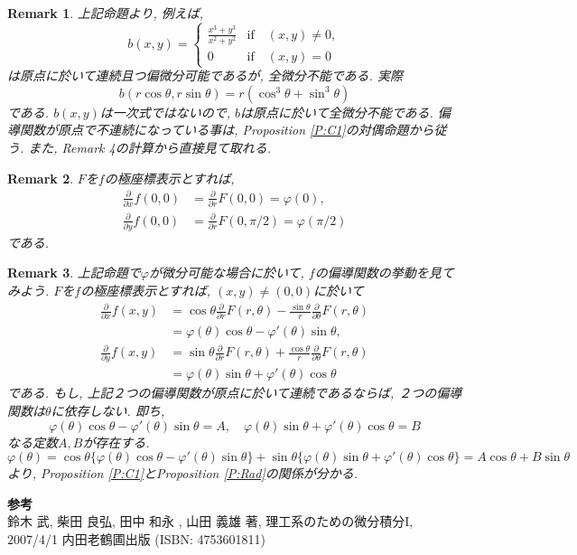 \documentclass{bxjsarticle}
\newtheorem{Remark}{Remark}%
\begin{document}
\begin{Remark}
上記命題より, 例えば,
	\[
	b(x,y) =
	\begin{cases}
	\frac{x^3+y^3}{x^2+y^2}
	&\mathrm{if} \quad (x,y) ≠ 0,\\
	0
	&\mathrm{if} \quad (x,y) = 0
	\end{cases}
	\]
は原点に於いて連続且つ偏微分可能であるが, 全微分不能である.
実際
	\[
	b(r \cos θ, r \sin θ)
	= r ( \cos^3 θ + \sin^3 θ)
	\]
である.
$b(x,y)$は一次式ではないので,
$b$は原点に於いて全微分不能である.
偏導関数が原点で不連続になっている事は,
Proposition \ref{P:C1}の対偶命題から従う.
また, Remark 4の計算から直接見て取れる.
\end{Remark}

\begin{Remark}
$F$を$f$の極座標表示とすれば,
	\begin{align*}
	\frac{∂}{∂x} f(0,0)
	&= \frac{∂}{∂ r} F(0,0) = φ(0),\\
	\frac{∂}{∂y} f(0,0)
	&= \frac{∂}{∂ r} F(0,π/2) = φ(π/2)
	\end{align*}
である.
\end{Remark}

\begin{Remark}
上記命題で$φ$が微分可能な場合に於いて,
$f$の偏導関数の挙動を見てみよう.
$F$を$f$の極座標表示とすれば,
$(x,y) ≠ (0,0)$に於いて
	\begin{align*}
	\frac{∂}{∂x} f(x,y)
	&= \cos θ \frac{∂}{∂ r} F(r,θ) - \frac{\sin θ}{r} \frac{∂}{∂ θ} F(r,θ)\\
	&= φ(θ) \cos θ - φ'(θ) \sin θ,\\
	\frac{∂}{∂y} f(x,y)
	&= \sin θ \frac{∂}{∂ r} F(r,θ) + \frac{\cos θ}{r} \frac{∂}{∂ θ} F(r,θ)\\
	&= φ(θ) \sin θ + φ'(θ) \cos θ
	\end{align*}
である.
もし, 上記２つの偏導関数が原点に於いて連続であるならば,
２つの偏導関数は$θ$に依存しない.
即ち,
	\[
	φ(θ) \cos θ - φ'(θ) \sin θ = A,\quad
	φ(θ) \sin θ + φ'(θ) \cos θ = B
	\]
なる定数$A,B$が存在する.
	\[
	φ(θ)
	= \cos θ \big\{ φ(θ) \cos θ - φ'(θ) \sin θ \}
	+ \sin θ \big\{ φ(θ) \sin θ + φ'(θ) \cos θ \}
	= A \cos θ + B \sin θ
	\]
より, Proposition \ref{P:C1}とProposition \ref{P:Rad}の関係が分かる.
\end{Remark}

\noindent
{\bf 参考}\\
鈴木 武, 柴田 良弘, 田中 和永 , 山田 義雄 著,
理工系のための微分積分I,
2007/4/1 内田老鶴圃出版
(ISBN: 4753601811)
\end{document}
